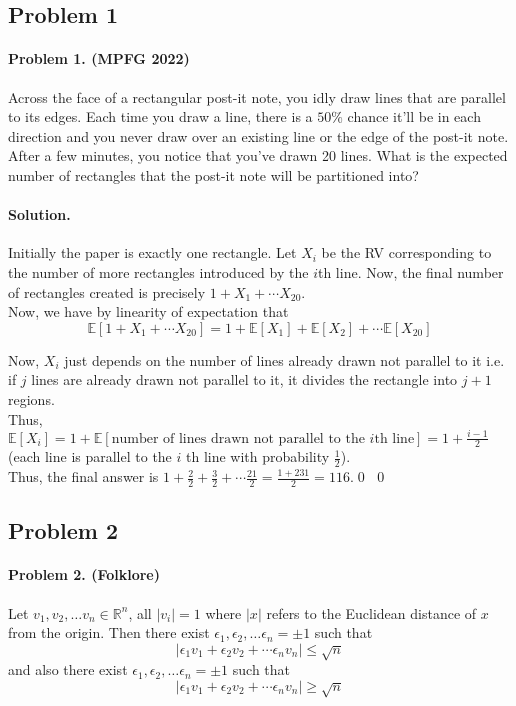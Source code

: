 \documentclass[12pt]{article}
\newenvironment{solution}
{\paragraph{Solution.}}
{\qed\eject}
\newcommand*{\EE}{\mathbb{E}}
\begin{document}
\subsection*{Problem 1}

\paragraph{\textbf{Problem 1. (MPFG 2022)}}Across the face of a rectangular post-it note, you idly draw lines that are parallel to its edges. Each time you draw a line, there is a $50\%$ chance it'll be in each direction and you never draw over an existing line or the edge of the post-it note. After a few minutes, you notice that you've drawn 20 lines. What is the expected number of rectangles that the post-it note will be partitioned into?

\begin{solution}
    Initially the paper is exactly one rectangle. Let $X_i$ be the RV corresponding to the number of more rectangles introduced by the $i$th line. Now, the final number of rectangles created is precisely $1+X_1+\cdots X_{20}$.\\
    
    Now, we have by linearity of expectation that \[\EE[1+X_1+\cdots X_{20}]=1+\EE[X_1]+\EE[X_2]+\cdots \EE[X_{20}]\]

    Now, $X_i$ just depends on the number of lines already drawn not parallel to it i.e. if $j$ lines are already drawn not parallel to it, it divides the rectangle into $j+1$ regions.\\

    Thus, $\EE[X_i]=1+\EE[\text{number of lines drawn not parallel to the $i$th line}]=1+\frac{i-1}{2}$ (each line is parallel to the $i$ th line with probability $\frac{1}{2}$).\\

    Thus, the final answer is $1+\frac{2}{2}+\frac{3}{2}+\cdots \frac{21}{2}=\frac{1+231}{2}=\boxed{116}$.\qed
\end{solution}


\subsection*{Problem 2}

\paragraph{\textbf{Problem 2. (Folklore)}} Let $v_1,v_2,\ldots v_n\in \mathbb{R}^n$, all $|v_i|=1$ where $|x|$ refers to the Euclidean distance of $x$ from the origin.  Then there exist $\epsilon_1, \epsilon_2, \ldots \epsilon_n = \pm 1$ such that \[|\epsilon_1v_1+\epsilon_2v_2+\cdots \epsilon_nv_n|\le \sqrt{n}\] and also there exist $\epsilon_1, \epsilon_2, \ldots \epsilon_n = \pm 1$ such that \[|\epsilon_1v_1+\epsilon_2v_2+\cdots \epsilon_nv_n|\ge \sqrt{n}\] 
\end{document}
